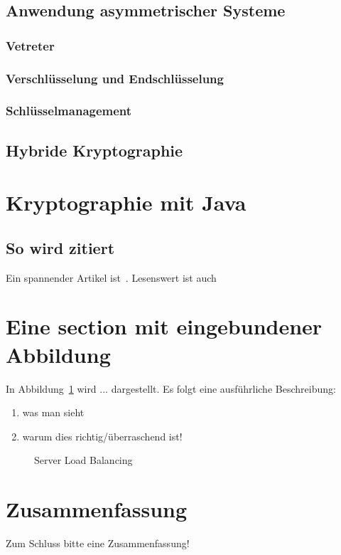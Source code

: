 \documentclass[paper=a4,11pt,german]{scrartcl} %
\begin{document}
\subsection{Anwendung asymmetrischer Systeme}
\subsubsection{Vetreter}
\subsubsection{Verschlüsselung und Endschlüsselung}
\subsubsection{Schlüsselmanagement}
\subsection{Hybride Kryptographie}


\section{Kryptographie mit Java}

\subsection{So wird zitiert}
Ein spannender Artikel ist~\cite{LSSZ08}. Lesenswert ist auch~\cite{oasa_mediawiki}

\section{Eine section mit eingebundener Abbildung}

In Abbildung~\ref{fig:sim} wird ... dargestellt. Es folgt eine
ausführliche Beschreibung:
\begin{enumerate}
	\item was man sieht
	\item warum dies richtig/überraschend ist!
\end{enumerate}

\begin{figure}[htb]
	\centering
	\caption{Server Load Balancing}
	\label{fig:sim}
\end{figure}


\section{Zusammenfassung}
Zum Schluss bitte eine Zusammenfassung!



\end{document}
